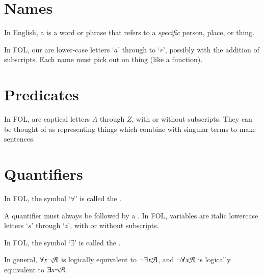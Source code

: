 \documentclass[12pt, a4paper, oneside, openright, titlepage]{book}
\begin{document}
\section{\textsection Names}

\begin{defn}
    In English, a  is a word or phrase that refers to a \emph{specific} person, place, or thing.
\end{defn}

\begin{defn}
    In FOL, our  are lower-case letters `$a$' through to `$r$', possibly with the addition of subscripts. Each name must pick out  on thing (like a function).
\end{defn}

\section{\textsection Predicates}

\begin{defn}
    In FOL,  are captical letters $A$ through $Z$, with or without subscripts. They can be thought of as representing things which combine with singular terms to make sentences.
\end{defn}


\section{\textsection Quantifiers}

\begin{defn}
    In FOL, the symbol `$\forall$' is called the .
\end{defn}

\begin{rmk}
    A quantifier must always be followed by a . In FOL, variables are italic lowercase letters `$s$' through `$z$', with or without subscripts.
\end{rmk}


\begin{defn}
    In FOL, the symbol `$\exists$' is called the .
\end{defn}

\begin{rmk}
    In general, $\forall x\neg \mathcal{A}$ is logically equivalent to $\neg \exists x\mathcal{A}$, and $\neg\forall x \mathcal{A}$ is logically equivalent to $\exists x \neg \mathcal{A}$.
\end{rmk}
\end{document}
